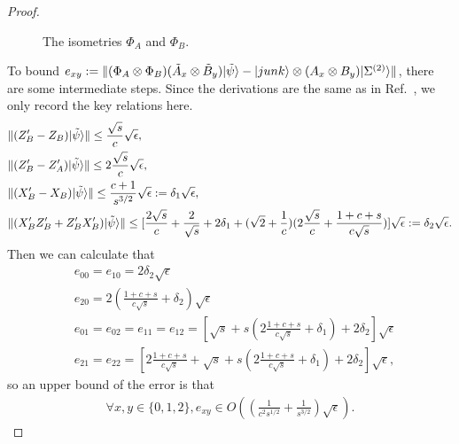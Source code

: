 \documentclass[11pt,letterpaper]{article}
\newcommand{\ket}[1]{|#1\rangle}
\newcommand{\x}{\otimes}
\DeclarePairedDelimiter{\norm}{\lVert}{\rVert}
\newcommand{\1}{\mathbb{1}}
\newcommand{\EPR}[1]{\Sigma^{(#1)}}
\newcommand{\tA}{\tilde{A}}
\newcommand{\tB}{\tilde{B}}
\newcommand{\tpsi}{\tilde{\psi}}
\theoremstyle{definition}
\begin{document}
\begin{proof}
\begin{figure}[H]
	\caption{The isometries $\Phi_A$ and $\Phi_B$.}
\end{figure}
To bound $e_{xy} := \norm{ (\Phi_A\x\Phi_B) (\tA_x \x \tB_y) \ket{\tpsi} - \ket{junk} \x (A_x\x B_y) \ket{\EPR{2}}}$,
there are some intermediate steps. Since the derivations are the same as in Ref.~\cite{bamps2015}, 
we only record the key relations here.
\begin{align*}
	&\norm{(Z_B' - Z_B) \ket{\tpsi}} \leq \frac{\sqrt{s}}{c} \sqrt{\epsilon},\\
	&\norm{(Z_B' - Z_A') \ket{\tpsi}} \leq 2 \frac{\sqrt{s}}{c}\sqrt{\epsilon}, \\
	&\norm{(X_B' - X_B) \ket{\tpsi}} \leq \frac{c+1}{s^{3/2}} \sqrt{\epsilon} := \delta_1 \sqrt{\epsilon},\\
	&\norm{(X_B'Z_B'+ Z_B'X_B')\ket{\tpsi}} \leq [\frac{2\sqrt{s}}{c} + \frac{2}{\sqrt{s}} + 2\delta_1 + 
	(\sqrt{2}+\frac{1}{c})(2\frac{\sqrt{s}}{c}+\frac{1+c+s}{c\sqrt{s}})]\sqrt{\epsilon}
	:= \delta_2 \sqrt{\epsilon}.
\end{align*}
Then we can calculate that 
\begin{align*}
	&e_{00} = e_{10} = 2\delta_2 \sqrt{\epsilon}\\
	&e_{20} = 2(\frac{1+c+s}{c\sqrt{s}} + \delta_2) \sqrt{\epsilon}\\
	&e_{01} = e_{02} = e_{11} = e_{12} = [\sqrt{s}+s(2\frac{1+c+s}{c\sqrt{s}} + \delta_1) + 2\delta_2]\sqrt{\epsilon}\\
	&e_{21} = e_{22} = [2\frac{1+c+s}{c\sqrt{s}} + \sqrt{s}+s(2\frac{1+c+s}{c\sqrt{s}} + \delta_1) + 2\delta_2]\sqrt{\epsilon},
\end{align*}
so an upper bound of the error is that
\begin{align}
	\forall x,y \in \{0,1,2\}, e_{xy} \in O((\frac{1}{c^2s^{1/2}} + \frac{1}{s^{3/2}})\sqrt{\epsilon}).
\end{align}
\end{proof}
\end{document}
